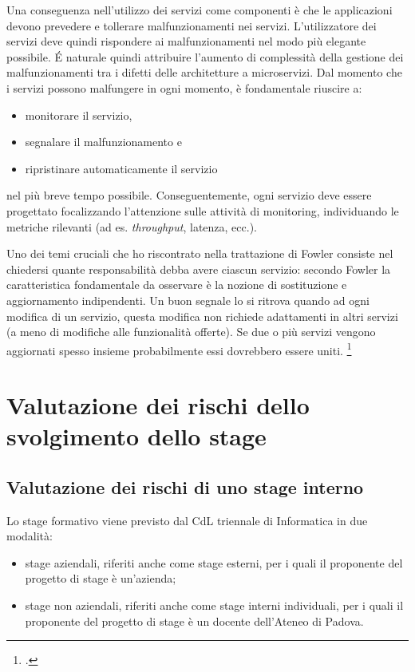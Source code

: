 Una conseguenza nell'utilizzo dei servizi come componenti è che le applicazioni devono prevedere e tollerare malfunzionamenti nei servizi. L'utilizzatore dei servizi deve quindi rispondere ai malfunzionamenti nel modo più elegante possibile.
É naturale quindi attribuire l'aumento di complessità della gestione dei malfunzionamenti tra i difetti delle architetture a microservizi.
Dal momento che i servizi possono malfungere in ogni momento, è fondamentale riuscire a:

\begin{itemize}
  \item monitorare il servizio,
  \item segnalare il malfunzionamento e
  \item ripristinare automaticamente il servizio
\end{itemize}
nel più breve tempo possibile. Conseguentemente, ogni servizio deve essere progettato focalizzando l'attenzione sulle attività di monitoring, individuando le metriche rilevanti (ad es. \emph{throughput}, latenza, ecc.).

Uno dei temi cruciali che ho riscontrato nella trattazione di Fowler consiste nel chiedersi quante responsabilità debba avere ciascun servizio: secondo Fowler la caratteristica fondamentale da osservare è la nozione di sostituzione e aggiornamento indipendenti.
Un buon segnale lo si ritrova quando ad ogni modifica di un servizio, questa modifica non richiede adattamenti in altri servizi (a meno di modifiche alle funzionalità offerte).
Se due o più servizi vengono aggiornati spesso insieme probabilmente essi dovrebbero essere uniti.
\footcite{site:fowler-microservices}

\pagebreak
\section{Valutazione dei rischi dello svolgimento dello stage}

\subsection{Valutazione dei rischi di uno stage interno}

Lo stage formativo viene previsto dal CdL triennale di Informatica in due modalità:
\begin{itemize}
  \item stage aziendali, riferiti anche come stage esterni, per i quali il proponente del progetto di stage è un'azienda;
  \item stage non aziendali, riferiti anche come stage interni individuali, per i quali il proponente del progetto di stage è un docente dell'Ateneo di Padova.
\end{itemize}


